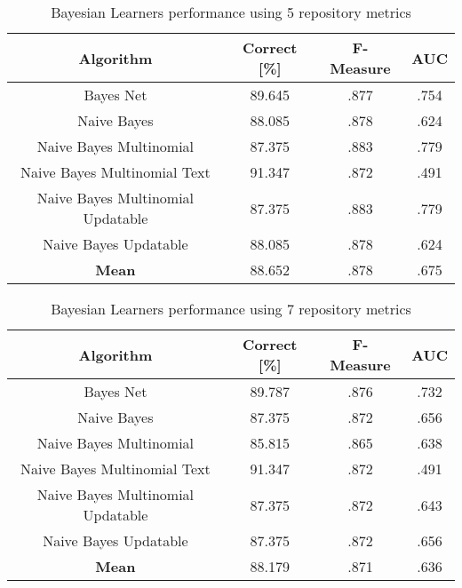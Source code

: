 \begin{table}[h!]
\centering
\begin{tabular}{ |c|c|c|c| }
 \hline
 \textbf{Algorithm} & \textbf{Correct [\%]} & \textbf{F-Measure} & \textbf{AUC}  \\
 \hline
 Bayes Net & 89.645 & .877 & .754    \\
 \hline
 Naive Bayes &  88.085 & .878 & .624   \\
 \hline
  Naive Bayes Multinomial & 87.375 & .883 & .779\\
 \hline
  Naive Bayes Multinomial Text & 91.347 & .872 & .491  \\
 \hline
  Naive Bayes Multinomial Updatable & 87.375 & .883 & .779 \\
 \hline
  Naive Bayes Updatable & 88.085 & .878 & .624 \\
 \hline
 \textbf{Mean}  & 88.652 & .878 & .675 \\
 \hline

\end{tabular}
\caption{Bayesian Learners performance using 5 repository metrics}
\label{table:BL_5}
\end{table}

\begin{table}[h!]
\centering
\begin{tabular}{ |c|c|c|c| }
 \hline
 \textbf{Algorithm} & \textbf{Correct [\%]} & \textbf{F-Measure} & \textbf{AUC}  \\
 \hline
 Bayes Net & 89.787 & .876 & .732    \\
 \hline
 Naive Bayes &  87.375 & .872 & .656   \\
 \hline
  Naive Bayes Multinomial & 85.815 & .865 & .638\\
 \hline
  Naive Bayes Multinomial Text & 91.347 & .872 & .491  \\
 \hline
  Naive Bayes Multinomial Updatable & 87.375 & .872 & .643 \\
 \hline
  Naive Bayes Updatable & 87.375 & .872 & .656 \\
 \hline
 \textbf{Mean}  & 88.179 & .871 & .636 \\
 \hline

\end{tabular}
\caption{Bayesian Learners performance using 7 repository metrics}
\label{table:BL_7}
\end{table}
